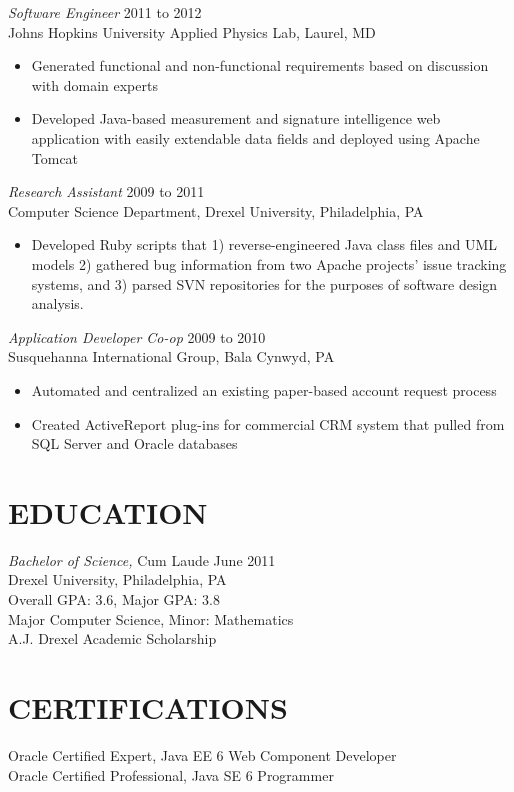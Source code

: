 \documentclass[line]{res}
\begin{document}
\begin{resume}
{\sl Software Engineer} \hfill 2011 to 2012 \\
Johns Hopkins University Applied Physics Lab, Laurel, MD
\begin{itemize}  \itemsep -2pt
\item Generated functional and non-functional requirements based on discussion with domain experts
\item Developed Java-based measurement and signature intelligence web application with easily extendable data fields and deployed using Apache Tomcat
\end{itemize}

{\sl Research Assistant} \hfill            2009 to 2011 \\
Computer Science Department, Drexel University, Philadelphia, PA
\begin{itemize}  \itemsep -2pt
\item Developed Ruby scripts that 1) reverse-engineered Java class files and UML models 2) gathered bug information from two Apache projects’ issue tracking systems, and 3) parsed SVN repositories for the purposes of software design analysis.
\end{itemize}

{\sl Application Developer Co-op} \hfill        2009 to 2010 \\
Susquehanna International Group, Bala Cynwyd, PA
\begin{itemize}  \itemsep -2pt
\item Automated and centralized an existing paper-based account request process
\item Created ActiveReport plug-ins for commercial CRM system that pulled from SQL Server and Oracle databases
\end{itemize}

\section{EDUCATION}
{\sl Bachelor of Science,} Cum Laude \hfill June 2011 \\
Drexel University, Philadelphia, PA \\
Overall GPA: 3.6, Major GPA: 3.8 \\
Major Computer Science, Minor: Mathematics \\
A.J. Drexel Academic Scholarship

\section{CERTIFICATIONS}
Oracle Certified Expert, Java EE 6 Web Component Developer \\
Oracle Certified Professional, Java SE 6 Programmer

\end{resume}
\end{document}
